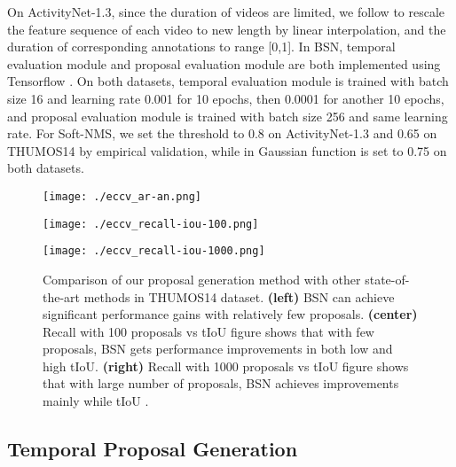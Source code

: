 \documentclass[runningheads]{llncs}
\begin{document}
On ActivityNet-1.3, since the duration of videos are limited, we follow \cite{lin2017temporal} to rescale the feature sequence of each video to new length  by linear interpolation, and the duration of corresponding annotations to range [0,1].
In BSN, temporal evaluation module and proposal evaluation module are both implemented using Tensorflow \cite{abadi2016tensorflow}. On both datasets, temporal evaluation module is trained with batch size 16 and learning rate 0.001 for 10 epochs, then 0.0001 for another 10 epochs, and proposal evaluation module is trained with batch size 256 and same learning rate. For Soft-NMS, we set the threshold  to 0.8 on ActivityNet-1.3 and 0.65 on THUMOS14 by empirical validation, while  in Gaussian function is set to 0.75 on both datasets.


\begin{figure*}[t]
\setlength{\abovecaptionskip}{-0.2cm} \setlength{\belowcaptionskip}{-0.7cm} \begin{center}
\begin{minipage}[b]{0.317\linewidth}
\centering
  {\texttt{[image: ./eccv\_ar-an.png]}}
\end{minipage}
\hspace{-0.01 in}  
\begin{minipage}[b]{0.33\linewidth}
\centering
  {\texttt{[image: ./eccv\_recall-iou-100.png]}}
\end{minipage}
\hspace{-0.05 in}  
\begin{minipage}[b]{0.33\linewidth}
\centering
  {\texttt{[image: ./eccv\_recall-iou-1000.png]}}
\end{minipage}
\end{center}
   \caption{Comparison of our proposal generation method with other state-of-the-art methods in THUMOS14 dataset. {\bf (left)} BSN can achieve significant performance gains with relatively few proposals. {\bf (center)} Recall with 100 proposals vs tIoU figure shows that with few proposals, BSN gets performance improvements in both low and high tIoU. {\bf (right)} Recall with 1000 proposals vs tIoU figure shows that with large number of proposals, BSN achieves improvements mainly while tIoU . }
\label{fig_recall}
\end{figure*}


\vspace{-0.15cm}

\subsection{Temporal Proposal Generation}
\end{document}

